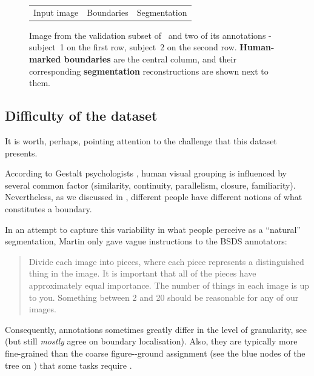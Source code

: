 \begin{figure}[t]
\begin{center}
\begin{tabular}{ c c c }
  Input image & Boundaries & Segmentation \\
  \end{tabular}
\end{center}
\caption[BSDS500 dataset - 2 annotations]{Image from the validation subset of~\cite{BSDS500resources} and two of its annotations - subject~1 on the first row, subject~2 on the second row. {\bf Human-marked boundaries} are the central column, and their corresponding {\bf segmentation} reconstructions are shown %
next to them.}
\label{fig:BSDS-annotations}
\end{figure}

\subsection*{Difficulty of the dataset}
It is worth, perhaps, pointing attention to the challenge that this dataset presents.

According to Gestalt psychologists \cite{Wertheimer1923untersuchungen,Kohler1929task,Koffka1935principles,Wertheimer1938laws}, human visual grouping is influenced by several common factor (\eg similarity, continuity, parallelism, closure, familiarity). Nevertheless, as we discussed in , different people have different notions of what constitutes a boundary. %

In an attempt to capture this variability in what people perceive as a ``natural'' segmentation, Martin \etal \cite{Martin01} only gave vague instructions to the BSDS annotators: \begin{quote}Divide each image into pieces, where each piece represents a distinguished thing in the image. It is important that all of the pieces have approximately equal importance. The number of things in each image is up to you. Something between 2 and 20 should be reasonable for any of our images.\end{quote}

Consequently, annotations sometimes greatly differ in the level of granularity, see  (but still {\it mostly} agree on boundary localisation). Also, they are typically more fine-grained than the coarse %
figure-\vs-ground assignment (see the blue nodes of the tree on ) that some tasks require \cite{Ren2006figure,Sundberg2011occlusion}.

